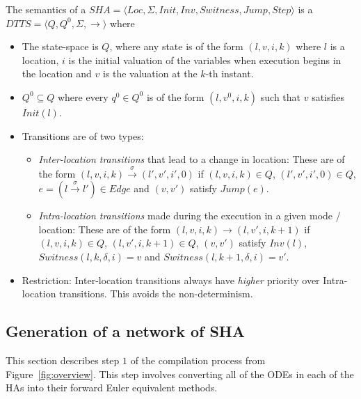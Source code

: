 \begin{definition}
	The semantics of a \newline
	$SHA = \langle Loc,  \Sigma, Init, Inv, Switness, Jump, Step \rangle$
	 is a 
	$DTTS = \langle Q, Q^0, \Sigma, \rightarrow \rangle$ where
	
	\begin{itemize}
		\item The state-space is $Q$, where any state is of the form
		$(l, v, i, k)$ where $l$ is a location, $i$ is the initial valuation
		of the variables when execution begins in the location and $v$ is
		the valuation at the $k$-th instant.
		\item $Q^0 \subseteq Q$ where every $q^0 \in Q^0$ is of the form
		$(l, v^0, i, k)$ such that $v$ satisfies $Init(l)$.
		\item Transitions are of two types:
		\begin{itemize}
			\item \emph{Inter-location transitions} that lead to a change in location:
			These are of the form
			$(l, v, i, k) \stackrel{\sigma} \rightarrow (l', v', i', 0)$ if
			$(l, v, i, k) \in Q$, $(l', v', i', 0) \in Q$,
			$e=(l \stackrel{\sigma} \rightarrow l') \in Edge$ and $(v, v')$
			satisfy $Jump(e)$.
			\item \emph{Intra-location transitions} made during the execution in
			a given mode / location: These are of the form
			$(l, v, i, k) \rightarrow (l, v', i, k+1)$ if
			$(l, v, i, k) \in Q$, $(l, v', i, k+1) \in Q$, $(v, v')$ satisfy
			$Inv(l)$, $Switness(l,k,\delta,i)=v$ and $Switness(l,k+1,\delta,i)=v'$.
		\end{itemize}
		
			\item Restriction: Inter-location transitions always have \emph{higher} priority
			over {Intra-location transitions}. This avoids the non-determinism.
	\end{itemize}
	\label{def:dtts}
\end{definition}

\subsection{Generation of a network of \ac{SHA}}
\label{sec:shaGeneration}

This section describes step $1$ of the compilation process from Figure~\ref{fig:overview}.
This step involves converting all of the \acp{ODE} in each of the \acp{HA} into their forward Euler equivalent methods.


